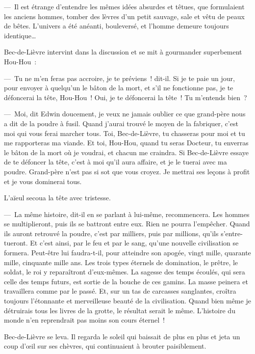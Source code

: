 \documentclass[french,twoside]{book} %
\begin{document}
— Il est étrange d’entendre les mêmes idées absurdes et têtues, que formulaient les anciens hommes, tomber des lèvres d’un petit sauvage, sale et vêtu de peaux de bêtes. L’univers a été anéanti, bouleversé, et l’homme demeure toujours identique…\par
Bec-de-Lièvre intervint dans la discussion et se mit à gourmander superbement Hou-Hou :\par
— Tu ne m’en feras pas accroire, je te préviens ! dit-il. Si je te paie un jour, pour envoyer à quelqu’un le bâton de la mort, et s’il ne fonctionne pas, je te défoncerai la tête, Hou-Hou ! Oui, je te défoncerai la tête ! Tu m’entends bien ?\par
— Moi, dit Edwin doucement, je veux ne jamais oublier ce que grand-père nous a dit de la poudre à fusil. Quand j’aurai trouvé le moyen de la fabriquer, c’est moi qui vous ferai marcher tous. Toi, Bec-de-Lièvre, tu chasseras pour moi et tu me rapporteras ma viande. Et toi, Hou-Hou, quand tu seras Docteur, tu enverras le bâton de la mort où je voudrai, et chacun me craindra. Si Bec-de-Lièvre essaye de te défoncer la tête, c’est à moi qu’il aura affaire, et je le tuerai avec ma poudre. Grand-père n’est pas si sot que vous croyez. Je mettrai ses leçons à profit et je vous dominerai tous.\par
L’aïeul secoua la tête avec tristesse.\par
— La même histoire, dit-il en se parlant à lui-même, recommencera. Les hommes se multiplieront, puis ils se battront entre eux. Rien ne pourra l’empêcher. Quand ils auront retrouvé la poudre, c’est par milliers, puis par millions, qu’ils s’entre-tueront. Et c’est ainsi, par le feu et par le sang, qu’une nouvelle civilisation se formera. Peut-être lui faudra-t-il, pour atteindre son apogée, vingt mille, quarante mille, cinquante mille ans. Les trois types éternels de domination, le prêtre, le soldat, le roi y reparaîtront d’eux-mêmes. La sagesse des temps écoulés, qui sera celle des temps futurs, est sortie de la bouche de ces gamins. La masse peinera et travaillera comme par le passé. Et, sur un tas de carcasses sanglantes, croîtra toujours l’étonnante et merveilleuse beauté de la civilisation. Quand bien même je détruirais tous les livres de la grotte, le résultat serait le même. L’histoire du monde n’en reprendrait pas moins son cours éternel !\par
Bec-de-Lièvre se leva. Il regarda le soleil qui baissait de plus en plus et jeta un coup d’œil sur ses chèvres, qui continuaient à brouter paisiblement.\par
\end{document}
